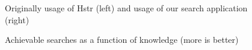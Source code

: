 \begin{figure}[h!]
\centering
{}\hfill
{}
\caption{Achievable searches as a function of knowledge (more is better)}
\small{Originally usage of Hstr (left) and usage of our search application (right)}
\label{eval-metrics-plot-cmds}
\end{figure}

